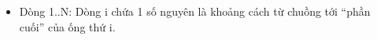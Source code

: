 \begin{itemize}
	\item     Dòng 1..N: Dòng i chứa 1 số nguyên là khoảng            cách từ chuồng tới “phần cuối” của ống thứ i.   
\end{itemize}